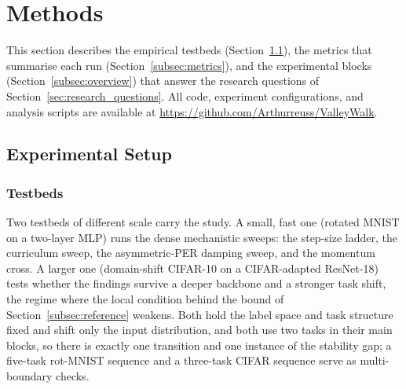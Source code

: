 \section{Methods}
\label{sec:methods}

This section describes the empirical testbeds (Section~\ref{subsec:setup}), the metrics that summarise each run (Section~\ref{subsec:metrics}), and the experimental blocks (Section~\ref{subsec:overview}) that answer the research questions of Section~\ref{sec:research_questions}. All code, experiment configurations, and analysis scripts are available at \url{https://github.com/Arthurreuss/ValleyWalk}.

\subsection{Experimental Setup}
\label{subsec:setup}

\subsubsection{Testbeds}
\label{subsec:testbed}

Two testbeds of different scale carry the study. A small, fast one (rotated MNIST on a two-layer MLP) runs the dense mechanistic sweeps: the step-size ladder, the curriculum sweep, the asymmetric-PER damping sweep, and the momentum cross. A larger one (domain-shift CIFAR-10 on a CIFAR-adapted ResNet-18) tests whether the findings survive a deeper backbone and a stronger task shift, the regime where the local condition behind the bound of Section~\ref{subsec:reference} weakens. Both hold the label space and task structure fixed and shift only the input distribution, and both use two tasks in their main blocks, so there is exactly one transition and one instance of the stability gap; a five-task rot-MNIST sequence and a three-task CIFAR sequence serve as multi-boundary checks.

